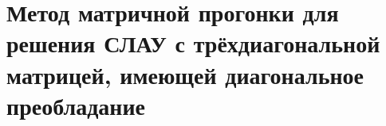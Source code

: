 \documentclass[__main__.tex]{subfiles}
\begin{document}
\section{Метод матричной прогонки для решения СЛАУ с трёхдиагональной матрицей, имеющей диагональное преобладание}
\end{document}
